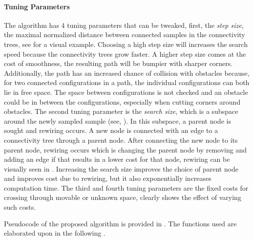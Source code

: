 \paragraph{Tuning Parameters}
The algorithm has 4 tuning parameters that can be tweaked, first, the \textit{step size}, the maximal normalized distance between connected samples in the connectivity trees, see  for a visual example. Choosing a high step size will increases the search speed because the connectivity trees grow faster. A higher step size comes at the cost of smoothness, the resulting path will be bumpier with sharper corners. Additionally, the path has an increased chance of collision with obstacles because, for two connected configurations in a path, the individual configurations can both lie in free space. The space between configurations is not checked and an obstacle could be in between the configurations, especially when cutting corners around obstacles. The second tuning parameter is the \textit{search size}, which is a subspace around the newly sampled sample (see, ). In this subspace, a parent node is sought and rewiring occurs. A new node is connected with an edge to a connectivity tree through a parent node. After connecting the new node to its parent node, rewiring occurs which is changing the parent node by removing and adding an edge if that results in a lower cost for that node, rewiring can be visually seen in . Increasing the search size improves the choice of parent node and improves cost due to rewiring, but it also exponentially increases computation time. The third and fourth tuning parameters are the fixed costs for crossing through movable or unknown space,  clearly shows the effect of varying such costs.\bs

Pseudocode of the proposed algorithm is provided in . The functions used are elaborated upon in the following .\bs


